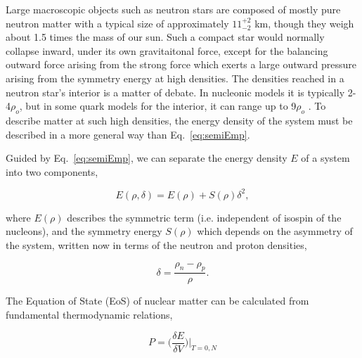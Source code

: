 Large macroscopic objects such as neutron stars are composed of mostly pure neutron matter \cite{neutronstar} with a typical size of approximately $11^{+2}_{-2}$ \si{\kilo\metre}, though they weigh about 1.5 times the mass of our sun. Such a compact star would normally collapse inward, under its own gravitaitonal force, except for the balancing outward force arising from the strong force which exerts a large outward pressure arising from the symmetry energy at high densities.  The densities reached in a neutron star's interior is a matter of debate. In nucleonic models it is typically 2-4$\rho_o$, but in some quark models for the interior, it can range up to  9$\rho_o$ \cite{neutronstar}. To describe matter at such high densities, the energy density of the system must be described in a more general way than Eq.~\ref{eq:semiEmp}.




Guided by Eq.~\ref{eq:semiEmp}, we can separate the energy density $E$ of a system into two components,

\begin{equation}
E(\rho,\delta) = E(\rho	) + S(\rho)\delta^2,
\label{eq:energyEos}
\end{equation}

where $E(\rho)$ describes the symmetric term (i.e. independent of isospin of the nucleons), and the symmetry energy $S(\rho)$ which depends on the asymmetry of the system, written now in terms of the neutron and proton densities, 

\begin{equation}
\delta = \frac{\rho_n - \rho_p}{\rho}.
\label{eq:asym}
\end{equation}

The Equation of State (EoS) of nuclear matter can be calculated from fundamental thermodynamic relations, 

\begin{equation}
P = \Big(\frac{\delta E}{\delta V}\Big)\vert_{T=0,N}
\label{eq:pressEos}
\end{equation}

